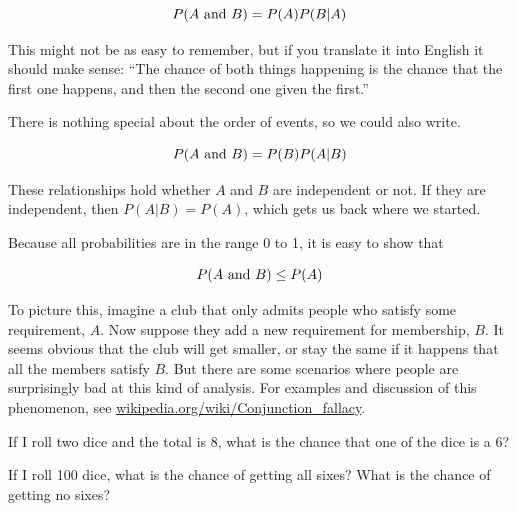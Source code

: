 \documentclass[12pt]{book}
\begin{document}
\[ P(A ~\mbox{and}~ B) = P(A) P(B|A) \]

This might not be as easy to remember, but if you translate it into
English it should make sense: ``The chance of both things happening
is the chance that the first one happens, and then the second one
given the first.''

There is nothing special about the order of events, so we could also
write.

\[ P(A ~\mbox{and}~ B) = P(B) P(A|B) \]

These relationships hold whether $A$ and $B$ are independent or not.
If they are independent, then $P(A|B) = P(A)$, which gets us back
where we started.

Because all probabilities are in the range 0 to 1, it is
easy to show that 

\[ P(A ~\mbox{and}~ B) \le P(A) \]

To picture this, imagine a club that only admits people who satisfy
some requirement, $A$.  Now suppose they add a new requirement for
membership, $B$.  It seems obvious that the club will get smaller, or
stay the same if it happens that all the members satisfy $B$.  But
there are some scenarios where people are surprisingly bad at this
kind of analysis.  For examples and discussion of this phenomenon, see
\url{wikipedia.org/wiki/Conjunction_fallacy}.


\begin{ex}
If I roll two dice and the total is 8, what is the chance that
one of the dice is a 6?
\end{ex}

\begin{ex}
If I roll 100 dice, what is the chance of getting all sixes?
What is the chance of getting no sixes?
\end{ex}
\end{document}
